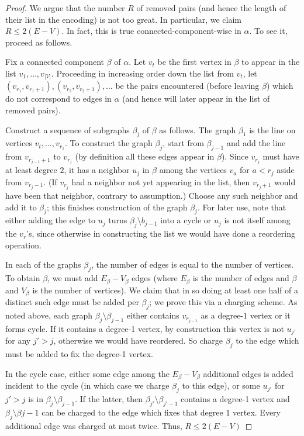 \begin{proof}
  We argue that the number $R$ of removed pairs (and hence the length of their list in the encoding) is not too great.
  In particular, we claim $R \leq 2(E - V)$.
  In fact, this is true connected-component-wise in $\alpha$.
  To see it, proceed as follows.

  Fix a connected component $\beta$ of $\alpha$.
  Let $v_t$ be the first vertex in $\beta$ to appear in the list $v_1,\ldots,v_{|V|}$.
  Proceeding in increasing order down the list from $v_t$, let $(v_{r_1},v_{r_1+1}), (v_{r_2},v_{r_2 +1}),\ldots$ be the pairs encountered (before leaving $\beta$) which do not correspond to edges in $\alpha$ (and hence will later appear in the list of removed pairs).

  Construct a sequence of subgraphs $\beta_j$ of $\beta$ as follows.
  The graph $\beta_1$ is the line on vertices $v_t,\ldots,v_{r_1}$.
  To construct the graph $\beta_{j}$, start from $\beta_{j-1}$ and add the line from $v_{r_{j-1}+1}$ to $v_{r_{j}}$ (by definition all these edges appear in $\beta$).
  Since $v_{r_j}$ must have at least degree $2$, it has a neighbor $u_j$ in $\beta$ among the vertices $v_{a}$ for $a < r_j$ aside from $v_{r_j-1}$.
  (If $v_{r_j}$ had a neighbor not yet appearing in the list, then $v_{r_j+1}$ would have been that neighbor, contrary to assumption.)
  Choose any such neighbor and add it to $\beta_j$; this finishes construction of the graph $\beta_j$.
  For later use, note that either adding the edge to $u_j$ turns $\beta_j \setminus b_{j-1}$ into a cycle or $u_j$ is not itself among the $v_r$'s, since otherwise in constructing the list we would have done a reordering operation.

  In each of the graphs $\beta_j$, the number of edges is equal to the number of vertices.
  To obtain $\beta$, we must add $E_\beta - V_\beta$ edges (where $E_\beta$ is the number of edges and $\beta$ and $V_\beta$ is the number of vertices).
  We claim that in so doing at least one half of a distinct such edge must be added per $\beta_j$; we prove this via a charging scheme.
  As noted above, each graph $\beta_j \setminus \beta_{j-1}$ either contains $v_{r_{j-1}}$ as a degree-$1$ vertex or it forms cycle.
  If it contains a degree-1 vertex, by construction this vertex is not $u_{j'}$ for any $j' > j$, otherwise we would have reordered.
  So charge $\beta_j$ to the edge which must be added to fix the degree-1 vertex.

  In the cycle case, either some edge among the $E_\beta - V_\beta$ additional edges is added incident to the cycle (in which case we charge $\beta_j$ to this edge), or some $u_{j'}$ for $j' > j$ is in $\beta_j \setminus \beta_{j-1}$.
  If the latter, then $\beta_{j'} \setminus \beta_{j' - 1}$ contains a degree-1 vertex and $\beta_{j} \setminus \beta{j -1}$ can be charged to the edge which fixes that degree $1$ vertex.
  Every additional edge was charged at most twice.
  Thus, $R \leq 2(E - V)$


\end{proof}
